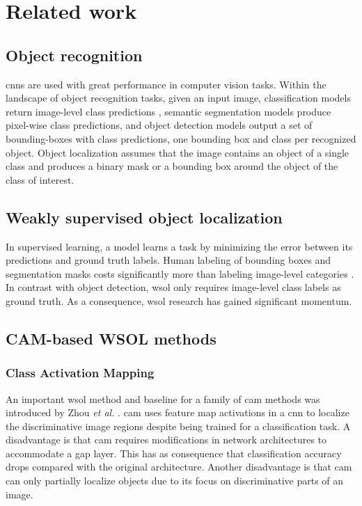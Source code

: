 \chapter{Related work} \label{ch:related_work}
\section{Object recognition}
\acrfull{cnn}s are used with great performance in computer vision tasks. Within the landscape of object recognition tasks, given an input image, classification models return image-level class predictions \cite{lecun1998gradient}, semantic segmentation models \cite{shelhamer2017fully} produce pixel-wise class predictions, and object detection models \cite{girshick2014rich, girshick2015fast, ren2015faster} output a set of bounding-boxes with class predictions, one bounding box and class per recognized object. Object localization \cite{russakovsky2015imagenet} assumes that the image contains an object of a single class and produces a binary mask or a bounding box around the object of the class of interest.

\section{Weakly supervised object localization}
In supervised learning, a model learns a task by minimizing the error between its predictions and ground truth labels. Human labeling of bounding boxes and segmentation masks costs significantly more than labeling image-level categories \cite{papandreou2015weakly}. In contrast with object detection, \acrshort{wsol} only requires image-level class labels as ground truth. As a consequence,  \acrshort{wsol} research \cite{zhou2016cvpr, zhang2018adversarial, zhang2018self, choe2019attention, singh2017hide} has gained significant momentum.

\section{CAM-based WSOL methods}
\subsection{Class Activation Mapping}
An important \acrshort{wsol} method and baseline for a family of \acrshort{cam} methods was introduced by Zhou \textit{et al.} \cite{zhou2016cvpr}. \acrfull{cam} uses feature map activations in a \acrlong{cnn} to localize the discriminative image regions despite being trained for a classification task. A disadvantage is that \acrshort{cam} requires modifications in network architectures to accommodate a \acrlong{gap} layer. This has as consequence that classification accuracy drops compared with the original architecture. Another disadvantage is that \acrshort{cam} can only partially localize objects due to its focus on discriminative parts of an image. 

